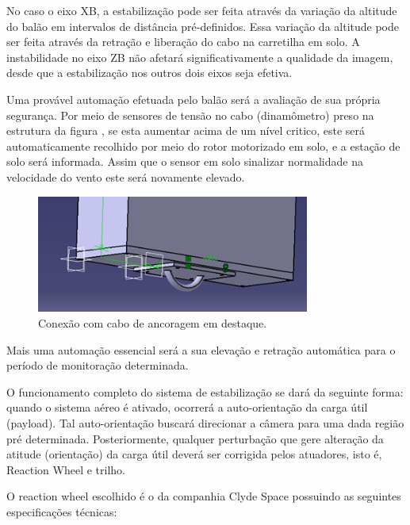 No caso o eixo XB, a estabilização pode ser feita através da variação da altitude do balão em intervalos de distância pré-definidos. Essa variação da altitude pode ser feita através da retração e liberação do cabo na carretilha em solo. A instabilidade no eixo ZB não afetará significativamente a qualidade da imagem, desde que a estabilização nos outros dois eixos seja efetiva.

Uma provável automação efetuada pelo balão será a avaliação de sua própria segurança. Por meio de sensores de tensão no cabo (dinamômetro) preso na estrutura da figura \label{img:caboancoragem}, se esta aumentar acima de um nível critico, este será automaticamente recolhido por meio do rotor motorizado em solo, e a estação de solo será informada. Assim que o sensor em solo sinalizar normalidade na velocidade do vento este será novamente elevado.

\begin{figure}[H]
  \centering
  \includegraphics[width=0.8\textwidth]{figuras/e3}
  \caption{Conexão com cabo de ancoragem em destaque.}
  \label{img:caboancoragem}
\end{figure}


Mais uma automação essencial será a sua elevação e retração automática para o período de monitoração determinada.

O funcionamento completo do sistema de estabilização se dará da seguinte forma: quando o sistema aéreo é ativado, ocorrerá a auto-orientação da carga útil (payload). Tal auto-orientação buscará direcionar a câmera para uma dada região pré determinada. Posteriormente, qualquer perturbação que gere alteração da atitude (orientação) da carga útil deverá ser corrigida pelos atuadores, isto é, Reaction Wheel e trilho.

O reaction wheel escolhido é o da companhia Clyde Space possuindo as seguintes especificações técnicas:

